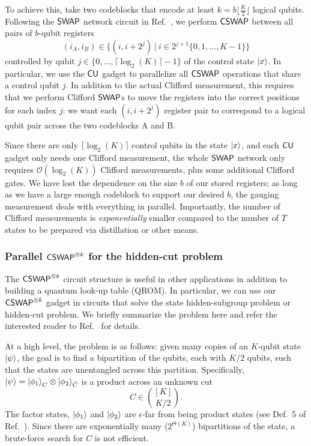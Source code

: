\documentclass[11pt]{article}
\begin{document}
To achieve this, take two codeblocks that encode at least $k = b\lfloor\frac{K}{2}\rfloor$ logical qubits.
Following the $\mathsf{SWAP}$ network circuit in Ref.~\cite{Low_2024}, we perform $\mathsf{CSWAP}$ between all pairs of $b$-qubit registers $$(i_A, i_B) \in \{(i,i+2^j)~|~i\in 2^{j+1}\{0, 1, \dots, K-1\}\}$$ controlled by qubit $j\in \{0,\dots,\lceil \log_2(K)\rceil -1\}$ of the control state $\ket{x}$.
In particular, we use the $\mathsf{CU}$ gadget to parallelize all $\mathsf{CSWAP}$ operations that share a control qubit $j$.
In addition to the actual Clifford measurement, this requires that we perform Clifford $\mathsf{SWAP}$s to move the registers into the correct positions for each index $j$: we want each $(i,i+2^j)$ register pair to correspond to a logical qubit pair across the two codeblocks A and B. 

Since there are only $\lceil \log_2(K)\rceil$ control qubits in the state $\ket{x}$, and each $\mathsf{CU}$ gadget only needs one Clifford measurement, the whole $\mathsf{SWAP}$ network only requires $\mathcal{O}(\log_2(K))$ Clifford measurements, plus some additional Clifford gates. We have lost the dependence on the size $b$ of our stored registers; as long as we have a large enough codeblock to support our desired $b$, the gauging measurement deals with everything in parallel. 
Importantly, the number of Clifford measurements is \emph{exponentially} smaller compared to the number of $T$ states to be prepared via distillation or other means.


\subsubsection{ Parallel $\mathsf{CSWAP}^{\otimes k}$ for the hidden-cut problem}

The $\mathsf{CSWAP}^{\otimes k}$ circuit structure is useful in other applications in addition to building a quantum look-up table (QROM). In particular, we can use our $\mathsf{CSWAP}^{\otimes k}$ gadget in circuits that solve the state hidden-subgroup problem or hidden-cut problem.
We briefly summarize the problem here and refer the interested reader to Ref.~\cite{bouland2024statehiddensubgroupproblem} for details.

At a high level, the problem is as follows: given many copies of an $K$-qubit state $\ket{\psi}$, the goal is to find a bipartition of the qubits, each with $K/2$ qubits, such that the states are unentangled across this partition.
Specifically, $\ket{\psi}=\ket{\phi_1}_C\otimes \ket{\phi_2}_{\bar{C}}$ is a product across an unknown cut $$C\in {[K]\choose K/2}.$$ The factor states, $\ket{\phi_1}$ and $\ket{\phi_2}$ are $\epsilon$-far from being product states (see Def.~5 of Ref.~\cite{bouland2024statehiddensubgroupproblem}).
Since there are exponentially many ($2^{\Theta(K)}$) bipartitions of the state, a brute-force search for $C$ is not efficient. 
\end{document}
